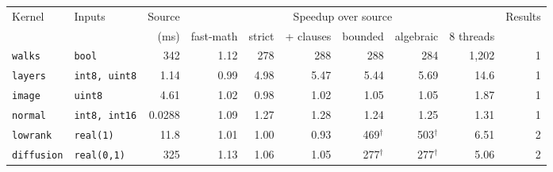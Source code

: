 \begin{tabular}{llrrrrrrrr}
\toprule
Kernel & Inputs & Source & \multicolumn{6}{c}{Speedup over source} & Results\\
\cmidrule(lr){4-9}
 & & (ms) & fast-math & strict & + clauses & bounded & algebraic & 8 threads & \\
\midrule
\texttt{walks} & \texttt{bool} & 342 & 1.12 & 278 & 288 & 288 & 284 & 1,202 & 1\\
\texttt{layers} & \texttt{int8, uint8} & 1.14 & 0.99 & 4.98 & 5.47 & 5.44 & 5.69 & 14.6 & 1\\
\texttt{image} & \texttt{uint8} & 4.61 & 1.02 & 0.98 & 1.02 & 1.05 & 1.05 & 1.87 & 1\\
\texttt{normal} & \texttt{int8, int16} & 0.0288 & 1.09 & 1.27 & 1.28 & 1.24 & 1.25 & 1.31 & 1\\
\texttt{lowrank} & \texttt{real(1)} & 11.8 & 1.01 & 1.00 & 0.93 & 469$^\dagger$ & 503$^\dagger$ & 6.51 & 2\\
\texttt{diffusion} & \texttt{real(0,1)} & 325 & 1.13 & 1.06 & 1.05 & 277$^\dagger$ & 277$^\dagger$ & 5.06 & 2\\
\bottomrule
\end{tabular}
